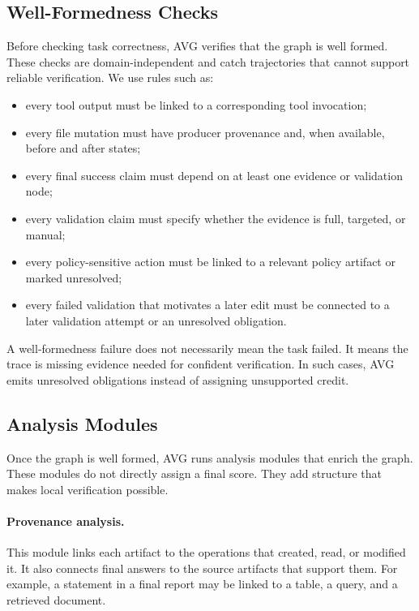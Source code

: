 \documentclass{article} %
\newcommand{\AVG}{\textsc{AVG}\xspace}
\begin{document}
\subsection{Well-Formedness Checks}

Before checking task correctness, \AVG verifies that the graph is well formed. These checks are domain-independent and catch trajectories that cannot support reliable verification. We use rules such as:
\begin{itemize}[leftmargin=1.2em]
\item every tool output must be linked to a corresponding tool invocation;
\item every file mutation must have producer provenance and, when available, before and after states;
\item every final success claim must depend on at least one evidence or validation node;
\item every validation claim must specify whether the evidence is full, targeted, or manual;
\item every policy-sensitive action must be linked to a relevant policy artifact or marked unresolved;
\item every failed validation that motivates a later edit must be connected to a later validation attempt or an unresolved obligation.
\end{itemize}

A well-formedness failure does not necessarily mean the task failed. It means the trace is missing evidence needed for confident verification. In such cases, \AVG emits unresolved obligations instead of assigning unsupported credit.

\subsection{Analysis Modules}

Once the graph is well formed, \AVG runs analysis modules that enrich the graph. These modules do not directly assign a final score. They add structure that makes local verification possible.

\paragraph{Provenance analysis.}
This module links each artifact to the operations that created, read, or modified it. It also connects final answers to the source artifacts that support them. For example, a statement in a final report may be linked to a table, a query, and a retrieved document.
\end{document}
